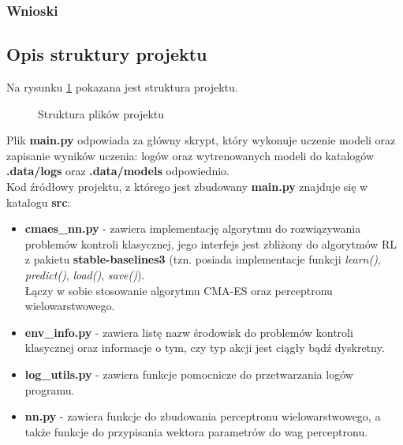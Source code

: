 \documentclass[12pt,a4paper]{article}
\begin{document}
\subsubsection{Wnioski}

\subsection{Opis struktury projektu}

Na rysunku \ref{fig:dirtree} pokazana jest struktura projektu.

\begin{figure}[!ht]
  \caption{Struktura plików projektu}
  \label{fig:dirtree}
\end{figure}

Plik \textbf{main.py} odpowiada za główny skrypt, który wykonuje uczenie
modeli oraz zapisanie wyników uczenia: logów oraz wytrenowanych modeli
do katalogów \textbf{.data/logs} oraz \textbf{.data/models} odpowiednio. \\

Kod źródłowy projektu, z którego jest zbudowany \textbf{main.py} znajduje się
w katalogu \textbf{src}:
\begin{itemize}
  \item \textbf{cmaes\_nn.py} - zawiera implementację algorytmu do rozwiązywania
        problemów kontroli klasycznej, jego interfejs jest zbliżony
        do algorytmów RL z pakietu \textbf{stable-baselines3}
        (tzn. posiada implementacje funkcji \emph{learn()}, \emph{predict()},
        \emph{load()}, \emph{save()}). \\
        Łączy w sobie stosowanie algorytmu CMA-ES oraz perceptronu wielowarstwowego.

  \item \textbf{env\_info.py} - zawiera listę nazw środowisk do problemów kontroli
        klasycznej oraz informacje o tym, czy typ akcji jest ciągły bądź dyskretny.

  \item \textbf{log\_utils.py} - zawiera funkcje pomocnicze do przetwarzania
        logów programu.

  \item \textbf{nn.py} - zawiera funkcje do zbudowania perceptronu
        wielowarstwowego, a także funkcje do przypisania wektora parametrów
        do wag perceptronu.
\end{itemize}
\end{document}
